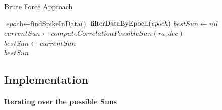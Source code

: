 \clearpage

\begin{algorithm}
	\caption{Brute Force Approach}\label{pseudocodeBruteForce}
	\begin{algorithmic}[1]
		\State $\textit{epoch} \gets \text{findSpikeInData()}$ 
		\State $\text{filterDataByEpoch(\textit{epoch})}$
		\State $bestSun \gets nil$
		\State $currentSun \gets computeCorrelationPossibleSun(ra, dec)$
		\State $bestSun \gets currentSun$
		\EndIf
		\EndFor
		\EndFor
		\\
		\Return $bestSun$
		\EndProcedure
	\end{algorithmic}
\end{algorithm}

%
%
%

\subsection{Implementation}

\paragraph{Iterating over the possible Suns}

